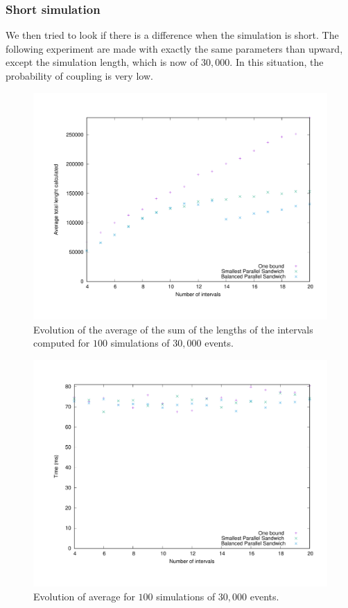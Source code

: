 \documentclass[a4paper,10pt]{article}
\begin{document}
\subsubsection{Short simulation}
We then tried to look if there is a difference when the simulation is short. The following experiment are made with exactly the same parameters than upward, except the simulation length, which is now of $30,000$. In this situation, the probability of coupling is very low.

\begin{figure}[H]
\centering
\label{fig:intersshort}
 \includegraphics[scale=0.45]{intersshort.pdf}
 \caption{Evolution of the average of the sum of the lengths of the intervals computed for $100$ simulations of $30,000$ events.}
\end{figure}

\begin{figure}[H]
\centering
\label{fig:timeshort}
 \includegraphics[scale=0.45]{timeshort.pdf}
 \caption{Evolution of average for $100$ simulations of $30,000$ events.}
\end{figure}
\end{document}
